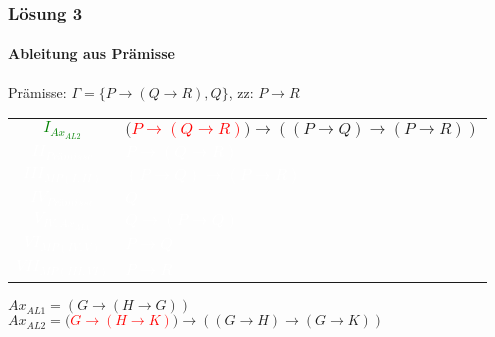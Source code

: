 \begin{frame}
	\frametitle{Lösung 3}
	\framesubtitle{Ableitung aus Prämisse}
	Prämisse: $\Gamma =\{P\rightarrow(Q\rightarrow R), Q\}$, zz: $P\rightarrow R$\\
	\begin{tabular}{cl}
		\textcolor{green}{$I_{Ax_{AL2}}$}      & $($\textcolor{red}{$P\rightarrow(Q\rightarrow R)$}$)\rightarrow((P\rightarrow Q)\rightarrow(P\rightarrow R))$ \\
		\textcolor{white}{$II_{Prämisse}$}     & \textcolor{white}{$P\rightarrow(Q\rightarrow R)$}                                                             \\
		\textcolor{white}{$III_{MP(I, II)}$}   & \textcolor{white}{$(P\rightarrow Q)\rightarrow(P\rightarrow R)$}                                              \\
		\textcolor{white}{$IV_{Prämisse}$}     & \textcolor{white}{$Q$}                                                                                        \\
		\textcolor{white}{$V_{IV, Ax_{AL1}}$}  & \textcolor{white}{$Q\rightarrow(P\rightarrow Q)$}                                                             \\
		\textcolor{white}{$VI_{MP(IV, V)}$}    & \textcolor{white}{$P\rightarrow Q$}                                                                           \\
		\textcolor{white}{$VII_{MP(III, VI)}$} & \textcolor{white}{$P\rightarrow R$}                                                                           \\
	\end{tabular}
	$Ax_{AL1} = (G\rightarrow(H\rightarrow G))$\\
	$Ax_{AL2} = ($\textcolor{red}{$G\rightarrow(H\rightarrow K)$}$)\rightarrow((G\rightarrow H)\rightarrow(G\rightarrow K))$\\
\end{frame}
